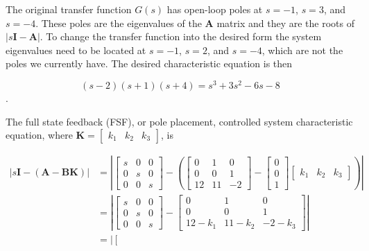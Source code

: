 \documentclass[main.tex]{subfiles}
\begin{document}
\begin{enumerate}
\begin{enumerate}
    The original transfer function $G(s)$ has open-loop poles at $s=-1$, $s=3$, and $s=-4$. These poles are the eigenvalues of the $\mathbf{A}$ matrix and they are the roots of $|s \mathbf{I}-\mathbf{A}|$. To change the transfer function into the desired form the system eigenvalues need to be located at $s=-1$, $s=2$, and $s=-4$, which are not the poles we currently have. The desired characteristic equation is then  
    
    $$(s-2)(s+1)(s+4) = s^3+3 s^2-6 s-8$$. 
    
    The full state feedback (FSF), or pole placement, controlled system characteristic equation, where $\mathbf{K}=\left[\begin{array}{lll}k_1 & k_2 & k_3 \end{array}\right]$, is
    
    $$
    \begin{aligned}
    |s \mathbf{I}-(\mathbf{A}-\mathbf{B K})| &= \left|\left[\begin{array}{ccc}
    s & 0 & 0 \\
    0 & s & 0 \\
    0 & 0 & s
    \end{array}\right] - \left(\left[\begin{array}{ccc}
    0 & 1 & 0 \\
    0 & 0 & 1 \\
    12 & 11 & -2
    \end{array}\right] - \left[\begin{array}{l}
    0 \\
    0 \\
    1
    \end{array}\right] \left[\begin{array}{lll}
    k_1 & k_2 & k_3
    \end{array}\right] \right) \right| \\
    & = \left|\left[\begin{array}{ccc}
    s & 0 & 0 \\
    0 & s & 0 \\
    0 & 0 & s
    \end{array}\right] - \left[\begin{array}{ccc}
    0 & 1 & 0 \\
    0 & 0 & 1 \\
    12 - k_1 & 11 - k_2 & -2 - k_3
    \end{array}\right] \right| \\
    & = \left| \left[\begin{array}{ccc}

\end{array}
\end{aligned}$$
\end{enumerate}
\end{enumerate}
\end{document}
